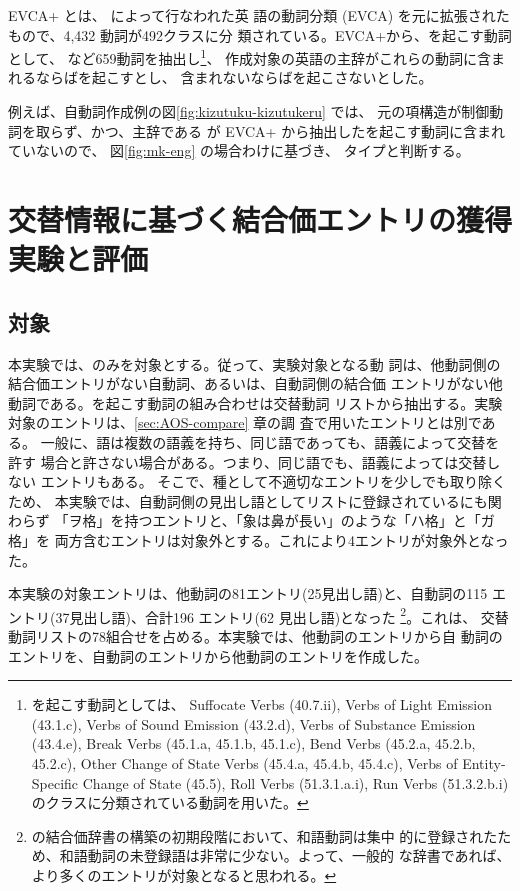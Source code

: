 \documentclass[japanese]{jnlp}
\newcommand{\eng}[1]{}
\newcommand{\iz}[1]{}
\newcommand{\soalt}{}
\newcommand{\altje}{}
\def\mpt#1{}
\renewcommand{\mpt}[1]{}
\begin{document}
EVCA+ とは、\cite{Levin:1993} によって行なわれた英
語の動詞分類 (EVCA) を元に拡張されたもので、4,432 動詞が492クラスに分
類されている。EVCA+から、\soalt{}を起こす動詞として、\eng{dissolve, spoil} 
など659動詞を抽出し\footnote{\soalt{}を起こす動詞としては、
Suffocate Verbs (40.7.ii),
Verbs of Light Emission (43.1.c),
Verbs of Sound Emission (43.2.d),
Verbs of Substance Emission (43.4.e),
Break Verbs (45.1.a, 45.1.b, 45.1.c),
Bend Verbs (45.2.a, 45.2.b, 45.2.c), 
Other Change of State Verbs (45.4.a, 45.4.b, 45.4.c),
Verbs of Entity-Specific Change of State (45.5),
Roll Verbs (51.3.1.a.i), 
Run Verbs (51.3.2.b.i) のクラスに分類されている動詞を用いた。}、
作成対象の英語の主辞がこれらの動詞に含まれるならば\soalt を起こすとし、
含まれないならば\soalt を起こさないとした。

例えば、自動詞作成例の図\ref{fig:kizutuku-kizutukeru} では、
元の項構造が制御動詞を取らず、かつ、主辞である \eng{injure} が
EVCA+ から抽出した\soalt{}を起こす動詞に含まれていないので、
図\ref{fig:mk-eng} の場合わけに基づき、
\iz{[passive]} タイプと判断する。


\clearpage

\section{交替情報に基づく結合価エントリの獲得実験と評価} \label{sec:eva}


\subsection{対象} \label{sec:experiment_target}

\mpt{Open textかどうか？ NH}

本実験では、\soalt{}のみを対象とする。従って、実験対象となる動
詞は、他動詞側の結合価エントリがない自動詞、あるいは、自動詞側の結合価
エントリがない他動詞である。\soalt を起こす動詞の組み合わせは交替動詞
リストから抽出する。実験対象のエントリは、\ref{sec:AOS-compare} 章の調
査で用いたエントリとは別である。
一般に、語は複数の語義を持ち、同じ語であっても、語義によって交替を許す
場合と許さない場合がある。つまり、同じ語でも、語義によっては交替しない
エントリもある。
そこで、種として不適切なエントリを少しでも取り除くため、
本実験では、自動詞側の見出し語としてリストに登録されているにも関わらず
「ヲ格」を持つエントリと、「象は鼻が長い」のような「ハ格」と「ガ格」を
両方含むエントリは対象外とする。これにより4エントリが対象外となった。


本実験の対象エントリは、他動詞の81エントリ(25見出し語)と、自動詞の115
エントリ(37見出し語)、合計196 エントリ(62 見出し語)となった
\footnote{\altje の結合価辞書の構築の初期段階において、和語動詞は集中
  的に登録されたため、和語動詞の未登録語は非常に少ない。よって、一般的
  な辞書であれば、より多くのエントリが対象となると思われる。}。これは、
交替動詞リストの78組合せを占める。本実験では、他動詞のエントリから自
動詞のエントリを、自動詞のエントリから他動詞のエントリを作成した。
\end{document}
